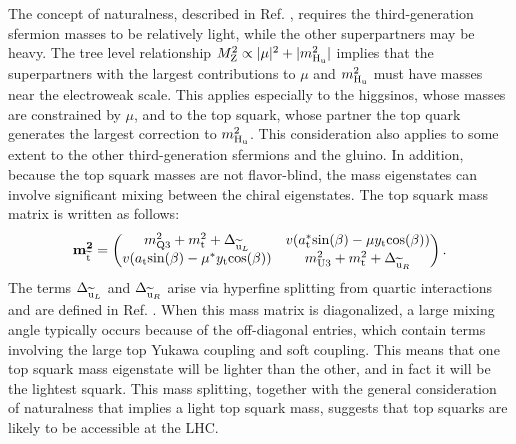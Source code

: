 \documentclass[12pt]{thesis}  %
\providecommand{\PU}{\ensuremath{\cmsSymbolFace{U}}\xspace}
\providecommand{\PQ}{\ensuremath{\cmsSymbolFace{Q}}\xspace}
\begin{document}
The concept of naturalness, described in Ref. \cite{NaturalSUSY}, requires the third-generation sfermion masses to be relatively light, while the other superpartners may be heavy. The tree level relationship $M_{\mathrm{Z}}^{2} \propto |\mu|^{2} + |m_{\mathrm{H}_\mathrm{u}}^{2}|$ implies that the superpartners with the largest contributions to $\mu$ and $m_{\mathrm{H}_\mathrm{u}}^{2}$ must have masses near the electroweak scale. This applies especially to the higgsinos, whose masses are constrained by $\mu$, and to the top squark, whose partner the top quark generates the largest correction to $m_{\mathrm{H}_\mathrm{u}}^{2}$. This consideration also applies to some extent to the other third-generation sfermions and the gluino. In addition, because the top squark masses are not flavor-blind, the mass eigenstates can involve significant mixing between the chiral eigenstates. The top squark mass matrix is written as follows:
\begin{equation}
\mathbf{m_{\sTop}^{2}} =
\begin{pmatrix}
m_{\PQ 3}^{2} + m_{\cPqt}^{2} + \Delta_{\sUp_{L}} & v(a_{\cPqt}^{\ast}\text{sin}(\beta) - \mu y_{\cPqt}\text{cos}(\beta)) \\
v(a_{\cPqt}\text{sin}(\beta) - \mu^{\ast} y_{\cPqt}\text{cos}(\beta)) & m_{\PU 3}^{2} + m_{\cPqt}^{2} + \Delta_{\sUp_{R}}
\end{pmatrix}.
\end{equation}
The terms $\Delta_{\widetilde{\mathrm{u}}_{L}}$ and $\Delta_{\widetilde{\mathrm{u}}_{R}}$ arise via hyperfine splitting from quartic interactions and are defined in Ref. \cite{Primer}. When this mass matrix is diagonalized, a large mixing angle typically occurs because of the off-diagonal entries, which contain terms involving the large top Yukawa coupling and soft coupling. This means that one top squark mass eigenstate will be lighter than the other, and in fact it will be the lightest squark. This mass splitting, together with the general consideration of naturalness that implies a light top squark mass, suggests that top squarks are likely to be accessible at the LHC.
\end{document}
